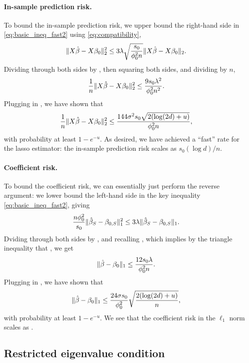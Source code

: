 \documentclass{article}
\begin{document}
\paragraph{In-sample prediction risk.}

To bound the in-sample prediction risk, we upper bound the right-hand side in
\eqref{eq:basic_ineq_fast2} using \eqref{eq:compatibility},  
\[
\|X\hat{\beta} - X\beta_0\|_2^2 \leq 3 \lambda \sqrt{\frac{s_0}{\phi_0^2 n}} 
\|X\hat{\beta} - X\beta_0\|_2.  
\]
Dividing through both sides by , then squaring
both sides, and dividing by $n$, 
\[
\frac{1}{n} \|X\hat{\beta} - X\beta_0\|_2^2 \leq \frac{9 s_0 \lambda^2}
  {\phi_0^2 n^2}.
\]
Plugging in , we have 
shown that 
\begin{equation}
\label{eq:risk_lasso_fast1}
\frac{1}{n} \|X\hat{\beta}-X\beta_0\|_2^2 \leq \frac{144 \sigma^2 s_0 \sqrt{2
    (\log(2d) + u)}}{\phi_0^2 n},   
\end{equation}
with probability at least $1-e^{-u}$. As desired, we have achieved a ``fast''
rate for the lasso estimator: the in-sample prediction risk scales as $s_0(\log
d)/n$.  

\paragraph{Coefficient risk.}

To bound the coefficient risk, we can essentially just perform the reverse
argument: we lower bound the left-hand side in the key inequality
\eqref{eq:basic_ineq_fast2}, giving  
\[
\frac{n \phi_0^2}{s_0} \|\hat{\beta}_S - \beta_{0,S} \|_1^2 \leq 3 \lambda 
 \|\hat{\beta}_S - \beta_{0,S}\|_1.
\]
Dviding through both sides by , and
recalling , which
implies by the triangle inequality that , we get
\[
\|\hat{\beta}-\beta_0\|_1 \leq \frac{12 s_0 \lambda}{\phi_0^2 n}.
\]
Plugging in , we have 
shown that 
\begin{equation}
\label{eq:risk_lasso_fast2}
\|\hat{\beta} - \beta_0\|_1 \leq \frac{24 \sigma s_0}{\phi_0^2}
\sqrt{\frac{2 (\log(2d) + u)}{n}},
\end{equation}
with probability at least $1-e^{-u}$. We see that the coefficient risk in the
$\ell_1$ norm scales as . 

\subsection{Restricted eigenvalue condition}
\end{document}
